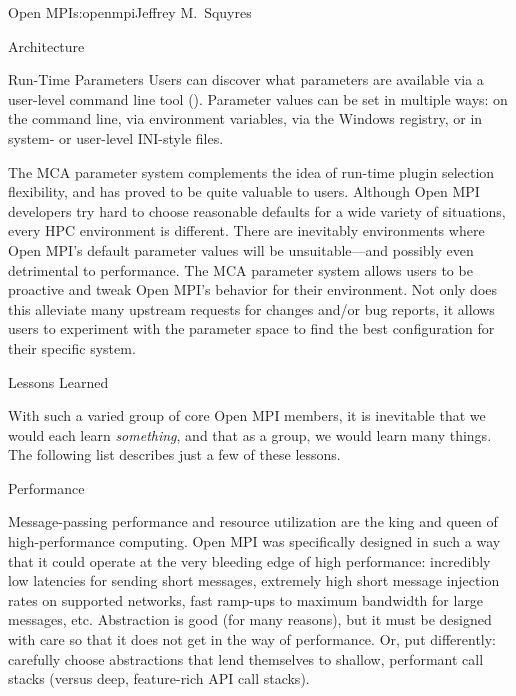 \begin{aosachapter}{Open MPI}{s:openmpi}{Jeffrey M.\ Squyres}
\begin{aosasect1}{Architecture}
\begin{aosasect2}{Run-Time Parameters}
Users can discover what parameters are available via a user-level
command line tool ().
%
Parameter values can be set in multiple ways: on the command line, via
environment variables, via the Windows registry, or in system- or
user-level INI-style files.

The MCA parameter system complements the idea of run-time plugin
selection flexibility, and has proved to be quite valuable to users.
%
Although Open MPI developers try hard to choose reasonable defaults
for a wide variety of situations, every HPC environment is different.
There are inevitably environments where Open MPI's default parameter
values will be unsuitable---and possibly even detrimental to
performance.
%
The MCA parameter system allows users to be proactive and tweak Open
MPI's behavior for their environment.  Not only does this alleviate
many upstream requests for changes and/or bug reports, it allows users
to experiment with the parameter space to find the best configuration
for their specific system.

\end{aosasect2}

\end{aosasect1}


\begin{aosasect1}{Lessons Learned}

With such a varied group of core Open MPI members, it is inevitable that
we would each learn \emph{something}, and that as a group, we would
learn many things.  The following list describes just a few of these
lessons.


\begin{aosasect2}{Performance}

Message-passing performance and resource utilization are the king
and queen of high-performance computing.
%
Open MPI was specifically designed in such a way that it could operate
at the very bleeding edge of high performance: incredibly low
latencies for sending short messages, extremely high short message
injection rates on supported networks, fast ramp-ups to maximum
bandwidth for large messages, etc.
%
Abstraction is good (for many reasons), but it must be designed with
care so that it does not get in the way of performance.  Or, put
differently: carefully choose abstractions that lend themselves to
shallow, performant call stacks (versus deep, feature-rich API call
stacks).


\end{aosasect2}
\end{aosasect1}
\end{aosachapter}
